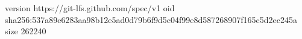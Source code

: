 version https://git-lfs.github.com/spec/v1
oid sha256:537a89e6283aa98b12e5ad0d79b6f9d5c04f99e8d587268907f165c5d2ec245a
size 262240

